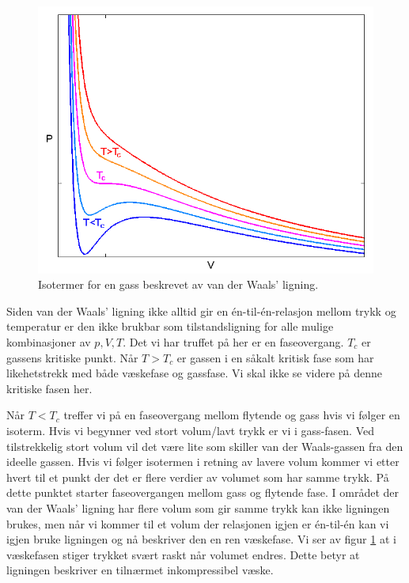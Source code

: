 \begin{figure}[t]
	\begin{center}
	\includegraphics[width=.7\textwidth]{./vdW_isotherm}
	\end{center}
	\caption{Isotermer for en gass beskrevet av van der Waals' ligning.}
	\label{fig:vdW}
\end{figure}

Siden van der Waals' ligning ikke alltid gir en \'en-til-\'en-relasjon mellom trykk og temperatur er den ikke brukbar som tilstandsligning for alle mulige kombinasjoner av $p,V,T$. Det vi har truffet på her er en faseovergang. $T_c$ er gassens kritiske punkt. Når $T > T_c$ er gassen i en såkalt kritisk fase som har likehetstrekk med både væskefase og gassfase. Vi skal ikke se videre på denne kritiske fasen her. 

Når $T<T_c$ treffer vi på en faseovergang mellom flytende og gass hvis vi følger en isoterm. Hvis vi begynner ved stort volum/lavt trykk er vi i gass-fasen. Ved tilstrekkelig stort volum vil det være lite som skiller van der Waals-gassen fra den ideelle gassen. Hvis vi følger isotermen i retning av lavere volum kommer vi etter hvert til et punkt der det er flere verdier av volumet som har samme trykk. På dette punktet starter faseovergangen mellom gass og flytende fase. I området der van der Waals' ligning har flere volum som gir samme trykk kan ikke ligningen brukes, men når vi kommer til et volum der relasjonen igjen er \'en-til-\'en kan vi igjen bruke ligningen og nå beskriver den en ren væskefase. Vi ser av figur \ref{fig:vdW} at i væskefasen stiger trykket svært raskt når volumet endres. Dette betyr at ligningen beskriver en tilnærmet inkompressibel væske.